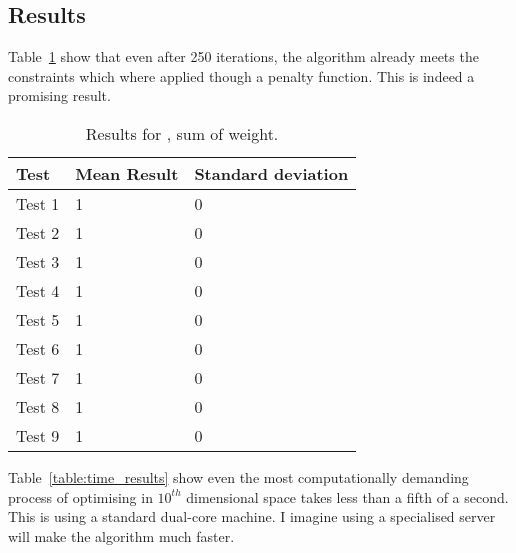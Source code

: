     \subsection{Results} %
    \label{sub:results}
      Table~\ref{table:sum_weight_results} show that even after 250 iterations, the algorithm already meets the constraints which where applied though a penalty function. This is indeed a promising result.
        \begin{table}[H]
          \setlength{\extrarowheight}{2.0pt}
          \begin{tabular}{|l|l|l|}
            \hline
            Test & Mean Result & Standard deviation \\
            \hline
            Test 1 & 1 & 0 \\
            \hline
            Test 2 & 1 & 0 \\
            \hline
            Test 3 & 1 & 0 \\
            \hline
            Test 4 & 1 & 0 \\
            \hline
            Test 5 & 1 & 0 \\
            \hline
            Test 6 & 1 & 0 \\
            \hline
            Test 7 & 1 & 0 \\
            \hline
            Test 8 & 1 & 0 \\
            \hline
            Test 9 & 1 & 0 \\
            \hline
          \end{tabular}
          \caption{Results for , sum of weight.}
          \label{table:sum_weight_results}
        \end{table}
      Table~\ref{table:time_results} show even the most computationally demanding process of optimising in $10^{th}$ dimensional space takes less than a fifth of a second. This is using a standard dual-core machine. I imagine using a specialised server will make the algorithm much faster. 
